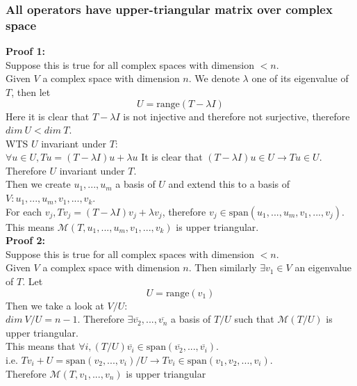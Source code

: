 \documentclass{article}
\begin{document}
\subsubsection{All operators have upper-triangular matrix over complex space}
\textbf{Proof 1:}\\
Suppose this is true for all complex spaces with dimension $<n$.\\
Given $V$ a complex space with dimension $n$. We denote $\lambda$ one of its eigenvalue of $T$, then let
\begin{equation*}
    U = \textrm{range}(T - \lambda I)
\end{equation*}
Here it is clear that $T - \lambda I$ is not injective and therefore not surjective, therefore $dim\ U < dim\ T$.\\
WTS $U$ invariant under $T$:\\
$\forall u \in U, Tu = (T - \lambda I)u + \lambda u$
It is clear that $(T - \lambda I)u \in U \rightarrow Tu \in U$.\\
Therefore $U$ invariant under $T$.\\
Then we create $u_1, ..., u_m$ a basis of $U$ and extend this to a basis of $V: u_1, ..., u_m, v_1, ..., v_k$.\\
For each $v_j, Tv_j = (T - \lambda I)v_j + \lambda v_j$, therefore $v_j \in \textrm{span}(u_1, ..., u_m, v_1, ..., v_j)$.\\
This means $\mathcal{M}(T, u_1, ..., u_m, v_1, ..., v_k)$ is upper triangular.\\
\textbf{Proof 2:}\\
Suppose this is true for all complex spaces with dimension $<n$.\\
Given $V$ a complex space with dimension $n$. Then similarly $\exists v_1 \in V$ an eigenvalue of $T$. Let
\begin{equation*}
    U = \textrm{range}(v_1)
\end{equation*}
Then we take a look at $V/U$:\\
$dim\ V/U = n-1$. Therefore $\exists \overline{v_2}, ..., \overline{v_n}$ a basis of $T/U$ such that $\mathcal{M}(T/U)$ is upper triangular.\\
This means that $\forall i, (T/U)\overline{v_i} \in \textrm{span}(\overline{v_2}, ..., \overline{v_i})$.\\
i.e. $Tv_i + U = \textrm{span}(v_2, ..., v_i)/U \rightarrow Tv_i \in \textrm{span}(v_1, v_2, ..., v_i)$.\\
Therefore $\mathcal{M}(T, v_1, ..., v_n)$ is upper triangular
\end{document}
